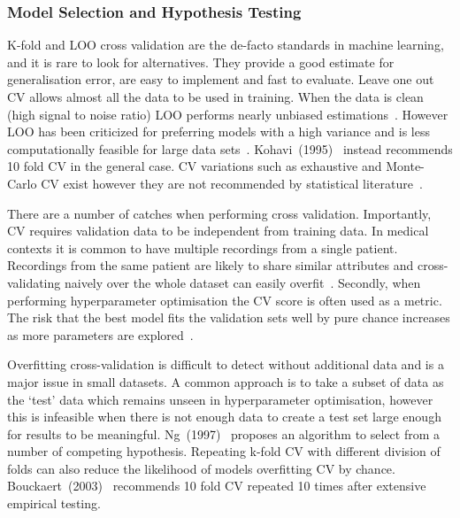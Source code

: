 \documentclass[12pt, twoside]{book}
\begin{document}
\subsubsection{Model Selection and Hypothesis Testing}
\label{msht}
K-fold and LOO cross validation are the de-facto standards in machine learning, and it is rare to look for alternatives. They provide a good estimate for generalisation error, are easy to implement and fast to evaluate. Leave one out CV allows almost all the data to be used in training. When the data is clean (high signal to noise ratio) LOO performs nearly unbiased estimations~\cite{crossvalsurvey}. However LOO has been criticized for preferring models with a high variance and is less computationally feasible for large data sets~\cite{kohavi1995study}. Kohavi~(1995)~\cite{kohavi1995study} instead recommends 10 fold CV in the general case. CV variations such as exhaustive and Monte-Carlo CV exist however they are not recommended by statistical literature~\cite{kfoldvsloo, crossvalsurvey}. 

There are a number of catches when performing cross validation. Importantly, CV requires validation data to be independent from training data. In medical contexts it is common to have multiple recordings from a single patient. Recordings from the same patient are likely to share similar attributes and cross-validating naively over the whole dataset can easily overfit~\cite{mpowerneto2017analysis}. Secondly, when performing hyperparameter optimisation the CV score is often used as a metric. The risk that the best model fits the validation sets well by pure chance increases as more parameters are explored~\cite{overfittingcv}.

Overfitting cross-validation is difficult to detect without additional data and is a major issue in small datasets. A common approach is to take a subset of data as the `test' data which remains unseen in hyperparameter optimisation, however this is infeasible when there is not enough data to create a test set large enough for results to be meaningful. Ng~(1997)~\cite{overfittingcv} proposes an algorithm to select from a number of competing hypothesis. Repeating k-fold CV with different division of folds can also reduce the likelihood of models overfitting CV by chance. Bouckaert~(2003)~\cite{bestcvempirical} recommends 10 fold CV repeated 10 times after extensive empirical testing.
\end{document}
